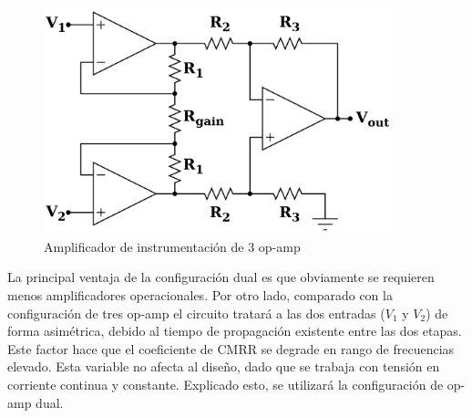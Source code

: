 \begin{figure}[H]
    \centering
    \includegraphics[width=0.9\textwidth]{../EJ4/resources/instrumental_3opamp.png}
    \caption{Amplificador de instrumentaci\'on de 3 op-amp}
    \label{fig:EJ4_instrumental_3opamp}
\end{figure}
 
 La principal ventaja de la configuraci\'on dual es que obviamente se requieren menos amplificadores operacionales. Por otro lado, comparado con la configuraci\'on de tres op-amp el circuito tratar\'a a las dos entradas ($V_1$ y $V_2$) de forma asim\'etrica, debido al tiempo de propagaci\'on existente entre las dos etapas. Este factor hace que el coeficiente de CMRR se degrade en rango de frecuencias elevado. Esta variable no afecta al diseño, dado que se trabaja con tensi\'on en corriente continua y constante. Explicado esto, se utilizar\'a la configuraci\'on de op-amp dual.



